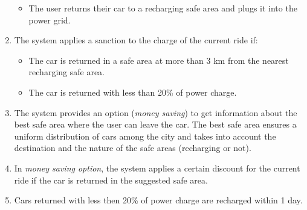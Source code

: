 \begin{enumerate}
\begin{itemize}
						\item The user returns their car to a recharging safe area and plugs it into the power grid.
					\end{itemize}
				\item The system applies a sanction to the charge of the current ride if:
					\begin{itemize}
						\item The car is returned in a safe area at more than 3 km from the nearest recharging safe area.
						\item The car is returned with less than 20\% of power charge.
					\end{itemize}
				\item The system provides an option (\textit{money saving}) to get information about the best safe area where the user can leave the car. The best safe area ensures a uniform distribution of cars among the city and takes into account the destination and the nature of the safe areas (recharging or not).
				\item In \textit{money saving option}, the system applies a certain discount for the current ride if the car is returned in the suggested safe area. %
				\item Cars returned with less then 20\% of power charge are recharged within 1 day.
			\end{enumerate}
			
			
			
			
